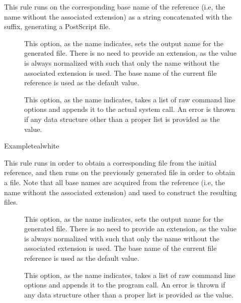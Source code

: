 \begin{description}
\item[] This rule runs  on the corresponding base name of the  reference (i.e, the name without the associated extension) as a string concatenated with the  suffix, generating a PostScript  file.

\begin{description}
\item[] This option, as the name indicates, sets the output name for the generated  file. There is no need to provide an extension, as the value is always normalized with  such that only the name without the associated extension is used. The base name of the current file reference is used as the default value.

\item[] This option, as the name indicates, takes a list of raw command line options and appends it to the actual system call. An error is thrown if any data structure other than a proper list is provided as the value.
\end{description}

\begin{codebox}{Example}{teal}{\icnote}{white}
\end{codebox}

\item[] This rule runs  in order to obtain a corresponding  file from the initial  reference, and then runs  on the previously generated  file in order to obtain a  file. Note that all base names are acquired from the  reference (i.e, the name without the associated extension) and used to construct the resulting files.

\begin{description}
\item[] This option, as the name indicates, sets the output name for the generated  file. There is no need to provide an extension, as the value is always normalized with  such that only the name without the associated extension is used. The base name of the current file reference is used as the default value.

\item[] This option, as the name indicates, takes a list of raw command line options and appends it to the  program call. An error is thrown if any data structure other than a proper list is provided as the value.


\end{description}
\end{description}
